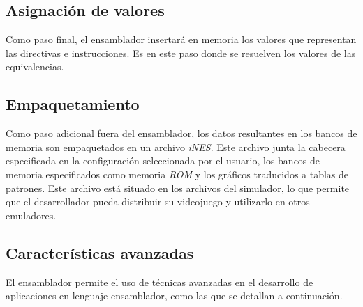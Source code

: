 \subsection{Asignación de valores}\label{subsec:asignacion-de-valores}

Como paso final, el ensamblador insertará en memoria los valores
que representan las directivas e instrucciones.
Es en este paso donde se resuelven los valores de las equivalencias.

\subsection{Empaquetamiento}\label{subsec:empaquetamiento}

Como paso adicional fuera del ensamblador, los datos resultantes
en los bancos de memoria son empaquetados en un archivo \textit{iNES}.
Este archivo junta la cabecera especificada en la configuración seleccionada
por el usuario, los bancos de memoria especificados como memoria
\textit{ROM} y los gráficos traducidos a tablas de patrones.
Este archivo está situado en los archivos del simulador, lo que
permite que el desarrollador pueda distribuir su videojuego
y utilizarlo en otros emuladores.

\subsection{Características avanzadas}\label{subsec:características-avanzadas}

El ensamblador permite el uso de técnicas avanzadas en
el desarrollo de aplicaciones en lenguaje ensamblador, como
las que se detallan a continuación.

